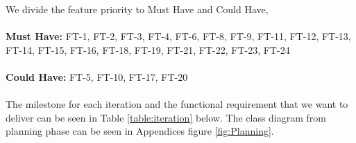 \documentclass[11pt]{article}
\begin{document}
We divide the feature priority to Must Have and Could Have, 
\\ \\
\textbf{Must Have:} FT-1, FT-2, FT-3, FT-4, FT-6, FT-8, FT-9, FT-11, FT-12, FT-13, FT-14, FT-15, FT-16, FT-18, FT-19, FT-21, FT-22, FT-23, FT-24
\\ \\
\textbf{Could Have:} FT-5, FT-10, FT-17, FT-20
\\ \\
The milestone for each iteration and the functional requirement that we want to deliver can be seen in Table \ref{table:iteration} below. The class diagram from planning phase can be seen in Appendices figure \ref{fig:Planning}.

\begin{center}

		
		
		
		
		
		


\end{center}
\end{document}

